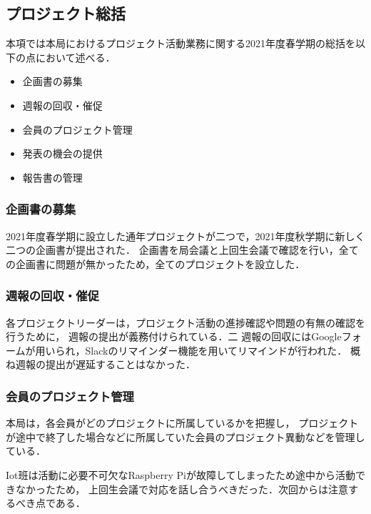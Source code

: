 \subsection*{プロジェクト総括}


本項では本局におけるプロジェクト活動業務に関する2021年度春学期の総括を以下の点において述べる．

\begin{itemize}
  \item 企画書の募集
  \item 週報の回収・催促
  \item 会員のプロジェクト管理
  \item 発表の機会の提供
  \item 報告書の管理
\end{itemize}

\subsubsection*{企画書の募集}

2021年度春学期に設立した通年プロジェクトが二つで，2021年度秋学期に新しく二つの企画書が提出された．
企画書を局会議と上回生会議で確認を行い，全ての企画書に問題が無かったため，全てのプロジェクトを設立した．

\subsubsection*{週報の回収・催促}

各プロジェクトリーダーは，プロジェクト活動の進捗確認や問題の有無の確認を行うために，
週報の提出が義務付けられている．二
週報の回収にはGoogleフォームが用いられ，Slackのリマインダー機能を用いてリマインドが行われた．
概ね週報の提出が遅延することはなかった．

\subsubsection*{会員のプロジェクト管理}

本局は，各会員がどのプロジェクトに所属しているかを把握し，
プロジェクトが途中で終了した場合などに所属していた会員のプロジェクト異動などを管理している．

Iot班は活動に必要不可欠なRaspberry Piが故障してしまったため途中から活動できなかったため，
上回生会議で対応を話し合うべきだった．次回からは注意するべき点である．

